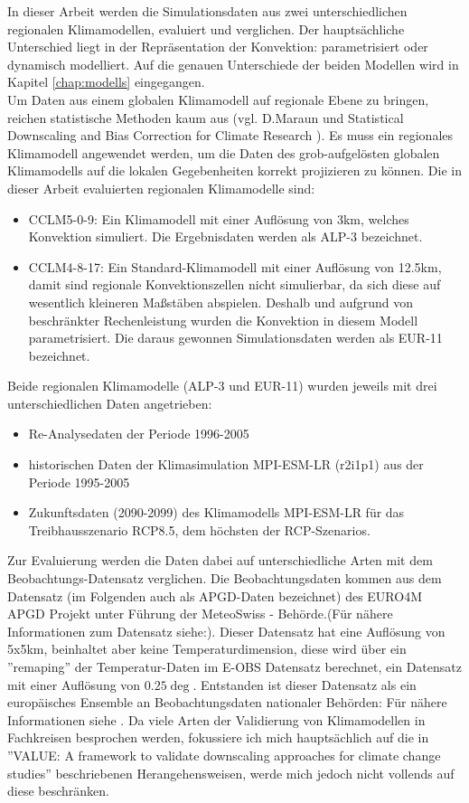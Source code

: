 In dieser Arbeit werden die Simulationsdaten aus zwei unterschiedlichen regionalen Klimamodellen, evaluiert und verglichen. Der hauptsächliche Unterschied liegt in der Repräsentation der Konvektion: parametrisiert oder dynamisch modelliert. Auf die genauen Unterschiede der beiden Modellen wird in Kapitel \ref{chap:modells} eingegangen.\\
Um Daten aus einem globalen Klimamodell auf regionale Ebene zu bringen, reichen statistische Methoden kaum aus (vgl. D.Maraun und Statistical Downscaling and Bias Correction for Climate Research \cite{statistical_downscaling}). Es muss ein regionales Klimamodell angewendet werden, um die Daten des grob-aufgelösten globalen Klimamodells auf die lokalen Gegebenheiten korrekt projizieren zu können. Die in dieser Arbeit evaluierten regionalen Klimamodelle sind:
\begin{itemize}
	\item CCLM5-0-9: Ein Klimamodell mit einer Auflösung von 3km, welches Konvektion simuliert. Die Ergebnisdaten werden als ALP-3 bezeichnet.
	\item CCLM4-8-17: Ein Standard-Klimamodell mit einer Auflösung von 12.5km, damit sind regionale Konvektionszellen nicht simulierbar, da sich diese auf wesentlich kleineren Maßstäben abspielen. Deshalb und aufgrund von beschränkter Rechenleistung wurden die Konvektion in diesem Modell parametrisiert. Die daraus gewonnen Simulationsdaten werden als EUR-11 bezeichnet.
\end{itemize}
Beide regionalen Klimamodelle (ALP-3 und EUR-11) wurden jeweils mit drei unterschiedlichen Daten angetrieben: 
\begin{itemize}
	\item Re-Analysedaten der Periode 1996-2005
	\item historischen Daten der Klimasimulation MPI-ESM-LR (r2i1p1) \cite{mpi-esm-lr} aus der Periode 1995-2005
	\item Zukunftsdaten (2090-2099) des Klimamodells MPI-ESM-LR \cite{mpi-esm-lr} für das Treibhausszenario RCP8.5, dem höchsten der RCP-Szenarios.
\end{itemize}
Zur Evaluierung werden die Daten dabei auf unterschiedliche Arten mit dem Beobachtungs-Datensatz verglichen. Die Beobachtungsdaten kommen aus dem Datensatz (im Folgenden auch als APGD-Daten bezeichnet) des EURO4M APGD Projekt unter Führung der MeteoSwiss - Behörde\cite{meteoswiss}.(Für nähere Informationen zum Datensatz siehe:\cite{apgd}). Dieser Datensatz hat eine Auflösung von 5x5km, beinhaltet aber keine Temperaturdimension, diese wird über ein ''remaping'' der Temperatur-Daten im E-OBS Datensatz berechnet, ein Datensatz mit einer Auflösung von $0.25\deg$. Entstanden ist dieser Datensatz als ein europäisches Ensemble an Beobachtungsdaten nationaler Behörden: Für nähere Informationen siehe \cite{eobs}.
Da viele Arten der Validierung von Klimamodellen in Fachkreisen besprochen werden, fokussiere ich mich hauptsächlich auf die in ''VALUE: A framework to validate downscaling approaches for climate change studies'' \cite{maraun_value} beschriebenen Herangehensweisen, werde mich jedoch nicht vollends auf diese beschränken.